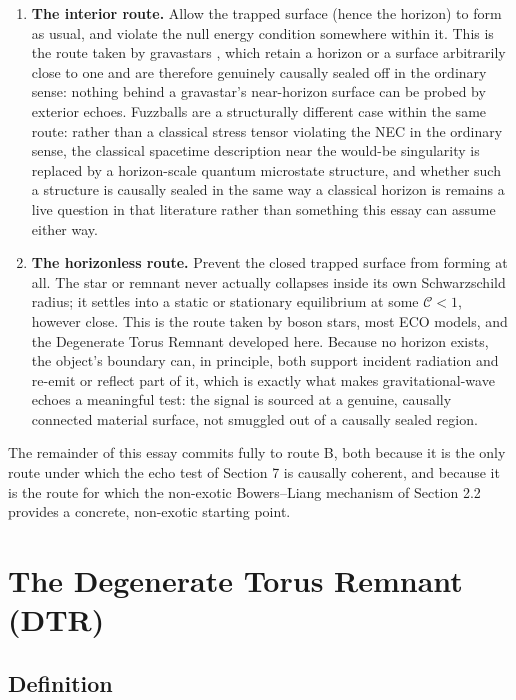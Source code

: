 \documentclass[11pt]{article}
\begin{document}
\begin{enumerate}[label=(\Alph*)]
\item \textbf{The interior route.} Allow the trapped surface (hence the horizon) to form as usual, and violate the null energy condition somewhere within it. This is the route taken by gravastars \cite{mazurmottola2004}, which retain a horizon or a surface arbitrarily close to one and are therefore genuinely causally sealed off in the ordinary sense: nothing behind a gravastar's near-horizon surface can be probed by exterior echoes. Fuzzballs \cite{mathur2005} are a structurally different case within the same route: rather than a classical stress tensor violating the NEC in the ordinary sense, the classical spacetime description near the would-be singularity is replaced by a horizon-scale quantum microstate structure, and whether such a structure is causally sealed in the same way a classical horizon is remains a live question in that literature rather than something this essay can assume either way.
\item \textbf{The horizonless route.} Prevent the closed trapped surface from forming at all. The star or remnant never actually collapses inside its own Schwarzschild radius; it settles into a static or stationary equilibrium at some $\mathcal{C} < 1$, however close. This is the route taken by boson stars, most ECO models, and the Degenerate Torus Remnant developed here. Because no horizon exists, the object's boundary can, in principle, both support incident radiation and re-emit or reflect part of it, which is exactly what makes gravitational-wave echoes a meaningful test: the signal is sourced at a genuine, causally connected material surface, not smuggled out of a causally sealed region.
\end{enumerate}

The remainder of this essay commits fully to route B, both because it is the only route under which the echo test of Section 7 is causally coherent, and because it is the route for which the non-exotic Bowers--Liang mechanism of Section 2.2 provides a concrete, non-exotic starting point.

\section{The Degenerate Torus Remnant (DTR)}

\subsection{Definition}
\end{document}
